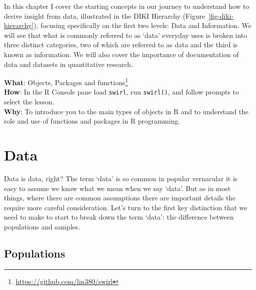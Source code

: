 \documentclass[
  letterpaper,
]{scrbook}
\DeclareRobustCommand{\href}[2]{#2\footnote{\url{#1}}}
\begin{document}
In this chapter I cover the starting concepts in our journey to
understand how to derive insight from data, illustrated in the DIKI
Hierarchy (Figure~\ref{fig-diki-hierarchy}), focusing specifically on
the first two levels: Data and Information. We will see that what is
commonly referred to as `data' everyday uses is broken into three
distinct categories, two of which are referred to as data and the third
is known as information. We will also cover the importance of
documentation of data and datasets in quantitative research.

\begin{tcolorbox}[enhanced jigsaw, title=\textcolor{quarto-callout-tip-color}{\faLightbulb}\hspace{0.5em}{Interactive programming}, breakable, colback=white, colframe=quarto-callout-tip-color-frame, bottomrule=.15mm, left=2mm, bottomtitle=1mm, colbacktitle=quarto-callout-tip-color!10!white, opacityback=0, arc=.35mm, toprule=.15mm, coltitle=black, leftrule=.75mm, opacitybacktitle=0.6, toptitle=1mm, titlerule=0mm, rightrule=.15mm]

\textbf{What}: \href{https://github.com/lin380/swirl}{Objects, Packages
and functions}\\
\textbf{How}: In the R Console pane load \texttt{swirl}, run
\texttt{swirl()}, and follow prompts to select the lesson.\\
\textbf{Why}: To introduce you to the main types of objects in R and to
understand the role and use of functions and packages in R programming.

\end{tcolorbox}

\hypertarget{data}{%
\section{Data}\label{data}}

Data is data, right? The term `data' is so common in popular vernacular
it is easy to assume we know what we mean when we say `data'. But as in
most things, where there are common assumptions there are important
details the require more careful consideration. Let's turn to the first
key distinction that we need to make to start to break down the term
`data': the difference between populations and samples.

\hypertarget{populations}{%
\subsection{Populations}\label{populations}}
\end{document}
